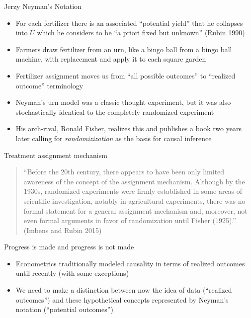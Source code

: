 \documentclass{beamer}
\begin{document}
\begin{frame}{Jerzy Neyman's Notation}

\begin{itemize}

\item For each fertilizer there is an associated ``potential yield'' that he collapses into $U$ which he considers to be ``a priori fixed but unknown'' (Rubin 1990)
\item Farmers draw fertilizer from an urn, like a bingo ball from a bingo ball machine, with replacement and apply it to each square garden
\item Fertilizer assignment moves us from ``all possible outcomes'' to ``realized outcome'' terminology
\item Neyman's urn model was a classic thought experiment, but it was also stochastically identical to the completely randomized experiment
\item His arch-rival, Ronald Fisher, realizes this and publishes a book two years later calling for \emph{randomizization} as the basis for causal inference
\end{itemize}

\end{frame}

\begin{frame}{Treatment assignment mechanism}

\begin{quote}

``Before the 20th century, there appears to have been only limited awareness of the concept of the assignment mechanism.  Although by the 1930s, randomized experiments were firmly established in some areas of scientific investigation, notably in agricultural experiments, there was no formal statement for a general assignment mechanism and, moreover, not even formal arguments in favor of randomization until Fisher (1925).'' (Imbens and Rubin 2015)

\end{quote}

\end{frame}

\begin{frame}{Progress is made and progress is not made}

\begin{itemize}

\item Econometrics traditionally modeled causality in terms of realized outcomes until recently (with some exceptions)
\item We need to make a distinction between now the idea of data (``realized outcomes'') and these hypothetical concepts represented by Neyman's notation (``potential outcomes'')

\end{itemize}


\end{frame}
\end{document}
